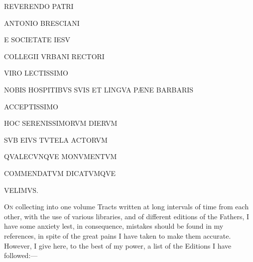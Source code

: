 



REVERENDO PATRI


ANTONIO BRESCIANI


E SOCIETATE IESV


COLLEGII VRBANI RECTORI


VIRO LECTISSIMO


NOBIS HOSPITIBVS SVIS ET LINGVA PÆNE BARBARIS


ACCEPTISSIMO


HOC SERENISSIMORVM DIERVM


SVB EIVS TVTELA ACTORVM


QVALECVNQVE MONVMENTVM


COMMENDATVM DICATVMQVE


VELIMVS.








O\textsc{n} collecting into one volume Tracts
written at long intervals of time from each other, with the use of
various libraries, and of different editions of the Fathers, I have
some anxiety lest, in consequence, mistakes should be found in my
references, in spite of the great pains I have taken to make them
accurate. However, I give here, to the best of my power, a list of the
Editions I have followed:—


